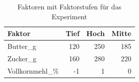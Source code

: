 \begin{table}
\centering
\caption{Faktoren mit Faktorstufen für das Experiment}
\label{table:faktorstufen}
\begin{tabular}{|l|r|r|r|}
\hline
Faktor              & Tief       & Hoch       & Mitte \\
\hline
Butter\_g           & 120        & 250        & 185   \\
Zucker\_g           & 160        & 280        & 220   \\
Vollkornmehl\_\%    & -1         & 1          & 0     \\
\hline
\end{tabular}
\end{table}

